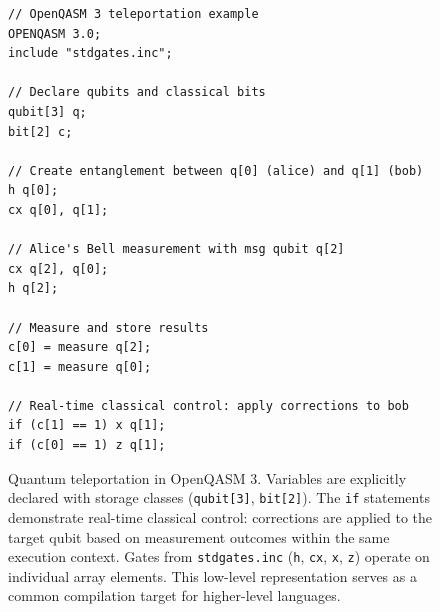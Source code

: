 \begin{figure}[t]
\begin{verbatim}
// OpenQASM 3 teleportation example
OPENQASM 3.0;
include "stdgates.inc";

// Declare qubits and classical bits
qubit[3] q;
bit[2] c;

// Create entanglement between q[0] (alice) and q[1] (bob)
h q[0];
cx q[0], q[1];

// Alice's Bell measurement with msg qubit q[2]
cx q[2], q[0];
h q[2];

// Measure and store results
c[0] = measure q[2];
c[1] = measure q[0];

// Real-time classical control: apply corrections to bob
if (c[1] == 1) x q[1];
if (c[0] == 1) z q[1];
\end{verbatim}
\caption{Quantum teleportation in OpenQASM 3. Variables are explicitly declared with storage classes (\texttt{qubit[3]}, \texttt{bit[2]}). The \texttt{if} statements demonstrate real-time classical control: corrections are applied to the target qubit based on measurement outcomes within the same execution context. Gates from \texttt{stdgates.inc} (\texttt{h}, \texttt{cx}, \texttt{x}, \texttt{z}) operate on individual array elements. This low-level representation serves as a common compilation target for higher-level languages.}
\label{fig:openqasm-teleport}
\end{figure}
